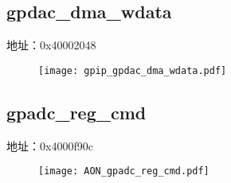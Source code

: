 \subsection{gpdac\_dma\_wdata}
\label{gpip-gpdac-dma-wdata}
地址：0x40002048
 \begin{figure}[H]
\texttt{[image: gpip\_gpdac\_dma\_wdata.pdf]}
\end{figure}


\subsection{gpadc\_reg\_cmd}
\label{AON-gpadc-reg-cmd}
地址：0x4000f90c
\begin{figure}[H]
	\texttt{[image: AON\_gpadc\_reg\_cmd.pdf]}
\end{figure}

